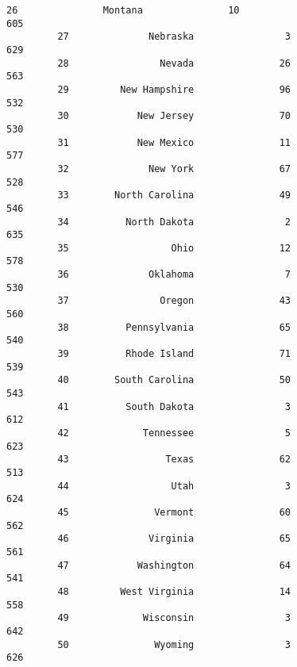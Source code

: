 \documentclass[11pt]{article}
\begin{document}
\begin{Verbatim}[commandchars=\\\{\}]
         26               Montana               10                                 605   
         27              Nebraska                3                                 629   
         28                Nevada               26                                 563   
         29         New Hampshire               96                                 532   
         30            New Jersey               70                                 530   
         31            New Mexico               11                                 577   
         32              New York               67                                 528   
         33        North Carolina               49                                 546   
         34          North Dakota                2                                 635   
         35                  Ohio               12                                 578   
         36              Oklahoma                7                                 530   
         37                Oregon               43                                 560   
         38          Pennsylvania               65                                 540   
         39          Rhode Island               71                                 539   
         40        South Carolina               50                                 543   
         41          South Dakota                3                                 612   
         42             Tennessee                5                                 623   
         43                 Texas               62                                 513   
         44                  Utah                3                                 624   
         45               Vermont               60                                 562   
         46              Virginia               65                                 561   
         47            Washington               64                                 541   
         48         West Virginia               14                                 558   
         49             Wisconsin                3                                 642   
         50               Wyoming                3                                 626   
         

\end{Verbatim}
\end{document}

